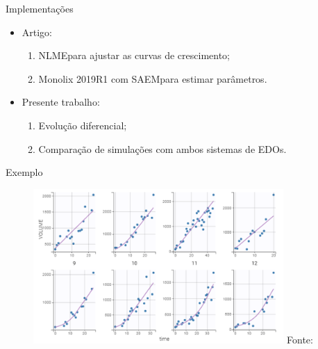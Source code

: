 \documentclass{beamer}
\begin{document}
\begin{frame}{Implementações}
    
    \begin{itemize}
        \setlength{\itemsep}{10pt}
        \item Artigo:
        \begin{enumerate}
            \vspace{0.2cm}
            \setlength{\itemsep}{10pt}
            \item NLME\footnotemark \hspace{0.1cm}para ajustar as curvas de crescimento;
            \item Monolix 2019R1 com SAEM\footnotemark \hspace{0.1cm}para estimar parâmetros.
        \end{enumerate}
        \item Presente trabalho:
        \begin{enumerate}
            \vspace{0.2cm}
            \setlength{\itemsep}{10pt}
            \item Evolução diferencial;
            \item Comparação de simulações com ambos sistemas de EDOs.
        \end{enumerate}
    \end{itemize}

    
\end{frame}

\begin{frame}{Exemplo\nocite{my}}

    \begin{figure}
        \centering
        \includegraphics[width=0.85\textwidth]{pic/s_fit.png}
        \hspace*{15pt}\hbox{\scriptsize Fonte:}\\
        \label{fig:map3}
    \end{figure}
    
    
\end{frame}
\end{document}
